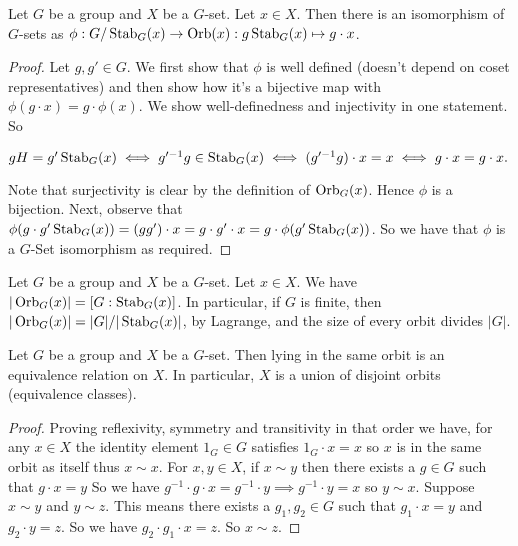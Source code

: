 \begin{theorem}
  Let $G$ be a group and $X$ be a $G$-set. Let $x\in X$. Then there is an isomorphism of
  $G$-sets as $\phi:G/\operatorname*{Stab}_{G}(x)\to \operatorname*{Orb}(x):g\operatorname*{Stab}_G(x)\mapsto g\cdot x$.
  \label{thm:orbStab}
\end{theorem}
\begin{proof}
  Let $g, g' \in G$. We first show that $\phi$ is well defined (doesn't depend on coset representatives) and
  then show how it's a bijective map with $\phi(g\cdot x)=g\cdot \phi(x)$. We show
  well-definedness and injectivity in one statement. So
  \begin{center}
  $
  gH=g'\operatorname*{Stab}_G(x) \iff g'^{-1}g\in \operatorname*{Stab}_G(x) \iff (g'^{-1}g) \cdot x = x \iff g\cdot x = g\cdot x.
  $
  \end{center}
  Note that surjectivity is clear by the definition of $\operatorname*{Orb}_G(x)$. Hence $\phi$ is a
  bijection. Next, observe that $\phi(g \cdot g'\operatorname*{Stab}_G(x))= (gg')\cdot x = g \cdot g' \cdot x = g \cdot \phi(g'\operatorname*{Stab}_G(x))$. So we have that $\phi$ is a $G$-Set isomorphism as required.
\end{proof}


\begin{corollary}
  Let $G$ be a group and $X$ be a $G$-set. Let $x\in X$. We have $|\operatorname*{Orb}_{G}(x)|=
  [G:\operatorname*{Stab}_G(x)]$. In particular, if $G$ is finite, then $|\operatorname*{Orb}_{G}(x)|=|G|/|\operatorname*{Stab}_G(x)|$,
  by Lagrange, and the size of every orbit divides $|G|$.
  \label{cor:orbStab}
\end{corollary}


\begin{theorem}
  Let $G$ be a group and $X$ be a $G$-set. Then lying in the same orbit is an equivalence
  relation on $X$. In particular, $X$ is a union of disjoint orbits (equivalence classes).
  \label{thm:eqRelOrb}
\end{theorem}
\begin{proof}
    Proving reflexivity, symmetry and transitivity in that order we have,
    for any $x \in X$ the identity element $1_G \in G$ satisfies $1_G \cdot x = x$ so $x$ is in the same orbit as itself thus $x \sim x$.
    For $x,y \in X$, if $x \sim y$ then there exists a $g \in G$ such that $g \cdot x = y$ So we have $g^{-1} \cdot g \cdot x = g^{-1} \cdot y \implies g^{-1} \cdot y = x$ so $y \sim x$.
    Suppose $x \sim y$ and $y \sim z$. This means there exists a $g_1, g_2 \in G$ such that $g_1 \cdot x = y$ and $g_2 \cdot y = z$. So we have $g_2 \cdot g_1 \cdot x = z$. So $x \sim z$.
\end{proof}


